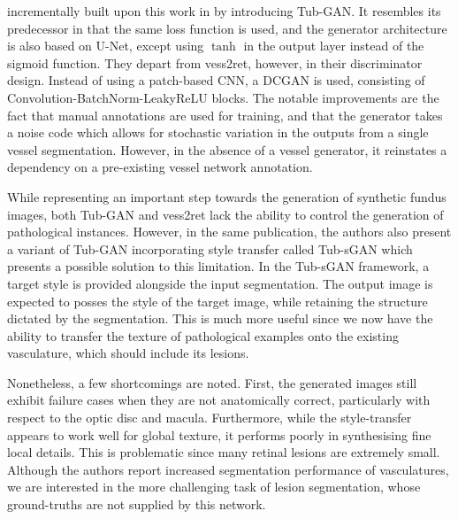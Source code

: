 \citeauthor{tubgan} \cite{tubgan} incrementally built upon this work in \citeyear{tubgan} by introducing Tub-GAN. 
It resembles its predecessor in that the same loss function is used, and the generator architecture is also based on U-Net, except using $\tanh$ in the output layer instead of the sigmoid function.
They depart from vess2ret, however, in their discriminator design. Instead of using a patch-based CNN, a DCGAN is used, consisting of Convolution-BatchNorm-LeakyReLU blocks.
The notable improvements are the fact that manual annotations are used for training, and that the generator takes a noise code which allows for stochastic variation in the outputs from a single vessel segmentation.
However, in the absence of a vessel generator, it reinstates a dependency on a pre-existing vessel network annotation.

While representing an important step towards the generation of synthetic fundus images, both Tub-GAN and vess2ret lack the ability to control the generation of pathological instances.
However, in the same publication, the authors also present a variant of Tub-GAN incorporating style transfer called Tub-sGAN which presents a possible solution to this limitation.
In the Tub-sGAN framework, a target style is provided alongside the input segmentation.
The output image is expected to posses the style of the target image, while retaining the structure dictated by the segmentation.
This is much more useful since we now have the ability to transfer the texture of pathological examples onto the existing vasculature, which should include its lesions.

Nonetheless, a few shortcomings are noted.
First, the generated images still exhibit failure cases when they are not anatomically correct, particularly with respect to the optic disc and macula.
Furthermore, while the style-transfer appears to work well for global texture, it performs poorly in synthesising fine local details.
This is problematic since many retinal lesions are extremely small.
Although the authors report increased segmentation performance of vasculatures, we are interested in the more challenging task of lesion segmentation, whose ground-truths are not supplied by this network.

